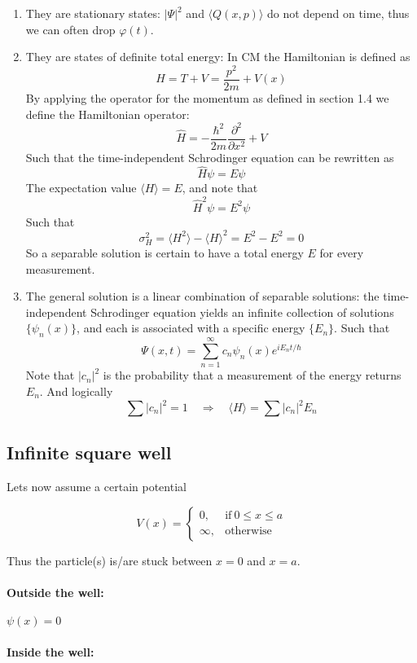 \documentclass[a4paper]{article}
\begin{document}
\begin{enumerate}
	\item They are stationary states: $|\Psi|^2$ and $\langle Q(x, p)\rangle$ do not depend on time, thus we can often drop $\varphi(t)$.
	\item They are states of definite total energy: In CM the Hamiltonian is defined as $$H=T+V=\frac{p^2}{2m}+V(x)$$ By applying the operator for the momentum as defined in section 1.4 we define the Hamiltonian operator: $$\hat{H}=-\frac{\hbar^2}{2m}\frac{\partial^2}{\partial x^2}+V$$ Such that the time-independent Schrodinger equation can be rewritten as $$\hat{H}\psi=E\psi$$ The expectation value $\langle H\rangle=E$, and note that $$\hat{H}^2\psi=E^2\psi$$ Such that $$\sigma_H^2=\langle H^2\rangle-\langle H\rangle^2=E^2-E^2=0$$ So a separable solution is certain to have a total energy $E$ for every measurement.
	\item The general solution is a linear combination of separable solutions: the time-independent Schrodinger equation yields an infinite collection of solutions $\{\psi_n(x)\}$, and each is associated with a specific energy $\{E_n\}$. Such that $$\Psi(x,t)=\sum_{n=1}^{\infty}c_n\psi_n(x)e^{iE_nt/\hbar}$$ Note that $|c_n|^2$ is the probability that a measurement of the energy returns $E_n$. And logically $$\sum |c_n|^2=1\quad\Rightarrow\quad\langle H\rangle=\sum |c_n|^2E_n$$
\end{enumerate}

\subsection{Infinite square well}

Lets now assume a certain potential

\[V(x) = \left\{
\begin{array}{lr}
0, & \text{if}\ 0 \le x \le a\\
\infty, & \text{otherwise}
\end{array}
\right.
\]

Thus the particle(s) is/are stuck between $x=0$ and $x=a$. 

\paragraph{Outside the well: } $\psi(x)=0$
\paragraph{Inside the well: }
\end{document}
